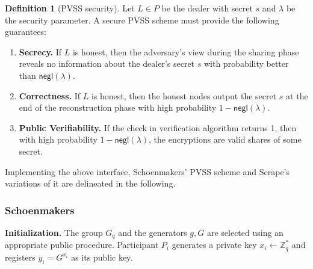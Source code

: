 \documentclass[11pt]{article}
\theoremstyle{definition}
\newtheorem{definition}[theorem]{Definition}
\theoremstyle{remark}
\begin{document}
\begin{definition}[PVSS security]
Let $L \in P$ be the dealer with secret $s$ and $\lambda$ be the security parameter. A secure PVSS scheme must provide the following guarantees:
\begin{enumerate}
\item \textbf{Secrecy.} If $L$ is honest, then the adversary's view during the sharing phase reveals no information about the dealer's secret $s$ with probability better than $\mathsf{negl}(\lambda)$.
\item \textbf{Correctness.} If $L$ is honest, then the honest nodes output the secret $s$ at the end of the reconstruction phase with high probability $1 - \mathsf{negl}(\lambda)$.
\item \textbf{Public Verifiability.} If the check in verification algorithm returns 1, then with high probability $1 - \mathsf{negl}(\lambda)$, the encryptions are valid shares of some secret.
\end{enumerate}
\end{definition}

Implementing the above interface, Schoenmakers' PVSS scheme and Scrape's variations of it are delineated in the following.

\subsubsection{Schoenmakers}
\textbf{Initialization.} The group $G_q$ and the generators $g, G$ are selected using an appropriate public procedure. Participant $P_i$ generates a private key $x_i \leftarrow \mathbb{Z}^*_q$ and registers $y_i = G^{x_i}$ as its public key.
\end{document}
